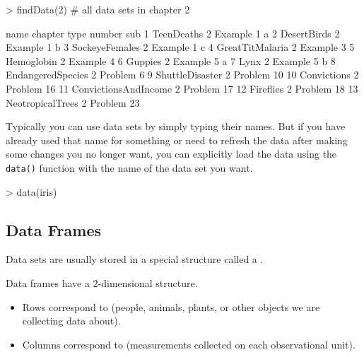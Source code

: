 \begin{Schunk}
\begin{Sinput}
> findData(2)               # all data sets in chapter 2
\end{Sinput}
\begin{Soutput}
                   name chapter    type number sub
1            TeenDeaths       2 Example      1   a
2           DesertBirds       2 Example      1   b
3        SockeyeFemales       2 Example      1   c
4       GreatTitMalaria       2 Example      3    
5            Hemoglobin       2 Example      4    
6               Guppies       2 Example      5   a
7                  Lynx       2 Example      5   b
8     EndangeredSpecies       2 Problem      6    
9       ShuttleDisaster       2 Problem     10    
10          Convictions       2 Problem     16    
11 ConvictionsAndIncome       2 Problem     17    
12            Fireflies       2 Problem     18    
13     NeotropicalTrees       2 Problem     23    
\end{Soutput}
\end{Schunk}

Typically you can use data sets by simply typing their names.  But if you have already
used that name for something or need to refresh the data after making some changes you no longer
want, you can explicitly load the data using the \verb!data()! function with the name of the 
data set you want.

\begin{Schunk}
\begin{Sinput}
> data(iris)
\end{Sinput}
\end{Schunk}

\subsection{Data Frames}

Data sets are usually stored in a special structure called a .

\begin{boxedText}
Data frames have a 2-dimensional structure.  
\medskip
\begin{itemize}
\item 
Rows correspond to 
 (people, animals, plants, or other objects we
are collecting data about).
\item
Columns correspond to  (measurements collected on each 
observational unit).
\end{itemize}
\end{boxedText}

